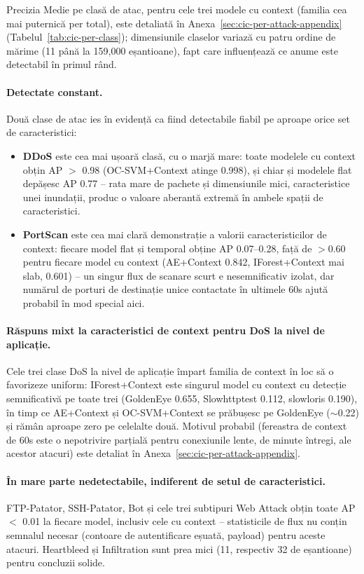 Precizia Medie pe clasă de atac, pentru cele trei modele cu context (familia cea mai puternică per total), este detaliată în Anexa~\ref{sec:cic-per-attack-appendix} (Tabelul~\ref{tab:cic-per-class}); dimensiunile claselor variază cu patru ordine de mărime (11 până la 159{,}000 eșantioane), fapt care influențează ce anume este detectabil în primul rând.

\paragraph{Detectate constant.} Două clase de atac ies în evidență ca fiind detectabile fiabil pe aproape orice set de caracteristici:

\begin{itemize}
  \item \textbf{DDoS} este cea mai ușoară clasă, cu o marjă mare: toate modelele cu context obțin AP $>$ 0.98 (OC-SVM+Context atinge 0.998), și chiar și modelele flat depășesc AP 0.77 -- rata mare de pachete și dimensiunile mici, caracteristice unei inundații, produc o valoare aberantă extremă în ambele spații de caracteristici.
  \item \textbf{PortScan} este cea mai clară demonstrație a valorii caracteristicilor de context: fiecare model flat și temporal obține AP 0.07--0.28, față de $>$0.60 pentru fiecare model cu context (AE+Context 0.842, IForest+Context mai slab, 0.601) -- un singur flux de scanare scurt e nesemnificativ izolat, dar numărul de porturi de destinație unice contactate în ultimele 60s ajută probabil în mod special aici.
\end{itemize}

\paragraph{Răspuns mixt la caracteristici de context pentru DoS la nivel de aplicație.} Cele trei clase DoS la nivel de aplicație împart familia de context în loc să o favorizeze uniform: IForest+Context este singurul model cu context cu detecție semnificativă pe toate trei (GoldenEye 0.655, Slowhttptest 0.112, slowloris 0.190), în timp ce AE+Context și OC-SVM+Context se prăbușesc pe GoldenEye ($\sim$0.22) și rămân aproape zero pe celelalte două. Motivul probabil (fereastra de context de 60s este o nepotrivire parțială pentru conexiunile lente, de minute întregi, ale acestor atacuri) este detaliat în Anexa~\ref{sec:cic-per-attack-appendix}.

\paragraph{În mare parte nedetectabile, indiferent de setul de caracteristici.} FTP-Patator, SSH-Patator, Bot și cele trei subtipuri Web Attack obțin toate AP $<$ 0.01 la fiecare model, inclusiv cele cu context -- statisticile de flux nu conțin semnalul necesar (contoare de autentificare eșuată, payload) pentru aceste atacuri. Heartbleed și Infiltration sunt prea mici (11, respectiv 32 de eșantioane) pentru concluzii solide.

